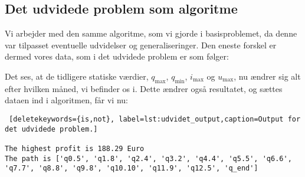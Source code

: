 \subsection{Det udvidede problem som algoritme}
Vi arbejder med den samme algoritme, som vi gjorde i basisproblemet, da denne var tilpasset eventuelle udvidelser og generaliseringer. Den eneste forskel er dermed vores data, som i det udvidede problem er som følger:

 

Det ses, at de tidligere statiske værdier, $q_{\max}$, $q_{\min}$, $i_{\max}$ og $u_{\max}$, nu ændrer sig alt efter hvilken måned, vi befinder os i. Dette ændrer også resultatet, og sættes dataen ind i algoritmen, får vi nu:


\begin{lstlisting} [deletekeywords={is,not}, label=lst:udvidet_output,caption=Output for det udvidede problem.]

The highest profit is 188.29 Euro
The path is ['q0.5', 'q1.8', 'q2.4', 'q3.2', 'q4.4', 'q5.5', 'q6.6', 'q7.7', 'q8.8', 'q9.8', 'q10.10', 'q11.9', 'q12.5', 'q_end']

\end{lstlisting}